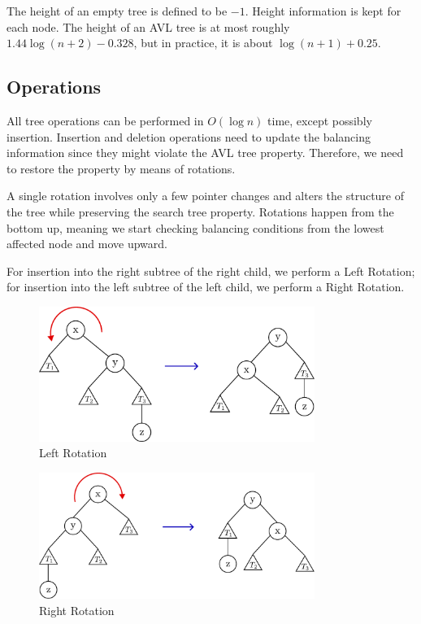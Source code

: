 The height of an empty tree is defined to be \(-1\). Height information is kept for each node. The height of an AVL tree is at most roughly \(1.44\log (n + 2) - 0.328\), but in practice, it is about \(\log (n + 1) + 0.25\).

\subsection{Operations}
All tree operations can be performed in \(O(\log n)\) time, except possibly insertion. Insertion and deletion operations need to update the balancing information since they might violate the AVL tree property. Therefore, we need to restore the property by means of rotations.

A single rotation involves only a few pointer changes and alters the structure of the tree while preserving the search tree property. Rotations happen from the bottom up, meaning we start checking balancing conditions from the lowest affected node and move upward.

For insertion into the right subtree of the right child, we perform a Left Rotation; for insertion into the left subtree of the left child, we perform a Right Rotation. 

\begin{minipage}{0.5\textwidth}
\begin{figure}[H]
  \centering
  \includegraphics[width=0.8\textwidth]{Figure/RR.pdf}
  \caption{Left Rotation}
\end{figure}
\end{minipage}
\begin{minipage}{0.5\textwidth}
\begin{figure}[H]
  \centering
  \includegraphics[width=0.8\textwidth]{Figure/LL.pdf}
  \caption{Right Rotation}
\end{figure}
\end{minipage}

